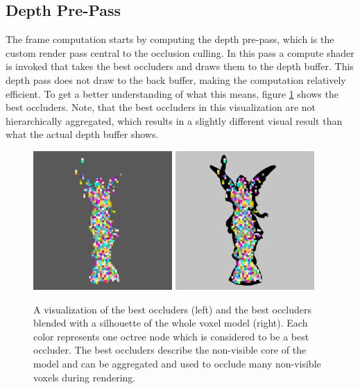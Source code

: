 \subsection*{Depth Pre-Pass} \label{subsec-depth-prepass}

The frame computation starts by computing the depth pre-pass, which is the custom render pass central 
to the occlusion culling. In this pass a compute shader is invoked that takes the best occluders and 
draws them to the depth buffer. This depth pass does not draw to the back buffer, making the computation 
relatively efficient. To get a better understanding of what this means, figure \ref{fig:best-occluder-viz} 
shows the best occluders. Note, that the best occluders in this visualization are not hierarchically 
aggregated, which results in a slightly different visual result than what the actual depth buffer shows. 

\begin{figure}[h]
    \centering
    \includegraphics[width=200px]{images/graphics/lucy-best-occluders-viz.jpg}
    \includegraphics[width=200px]{images/graphics/lucy-best-occluders-diff-viz.jpg}
    \caption{A visualization of the best occluders (left) and the best occluders blended with a silhouette 
    of the whole voxel model (right). Each color represents one octree node which is considered to be a best occluder.
    The best occluders describe the non-visible core of the model and can be aggregated and used to occlude 
    many non-visible voxels during rendering.}
    \label{fig:best-occluder-viz}
\end{figure}


